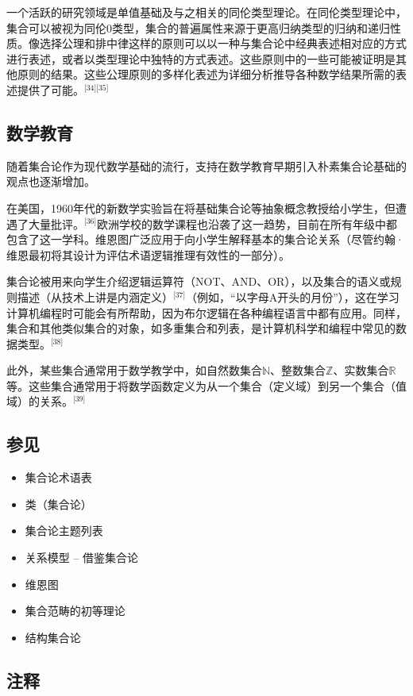一个活跃的研究领域是单值基础及与之相关的同伦类型理论。在同伦类型理论中，集合可以被视为同伦0类型，集合的普遍属性来源于更高归纳类型的归纳和递归性质。像选择公理和排中律这样的原则可以以一种与集合论中经典表述相对应的方式进行表述，或者以类型理论中独特的方式表述。这些原则中的一些可能被证明是其他原则的结果。这些公理原则的多样化表述为详细分析推导各种数学结果所需的表述提供了可能。\(^\text{[34][35]}\)
\subsection{数学教育}  
随着集合论作为现代数学基础的流行，支持在数学教育早期引入朴素集合论基础的观点也逐渐增加。

在美国，1960年代的新数学实验旨在将基础集合论等抽象概念教授给小学生，但遭遇了大量批评。\(^\text{[36]}\)欧洲学校的数学课程也沿袭了这一趋势，目前在所有年级中都包含了这一学科。维恩图广泛应用于向小学生解释基本的集合论关系（尽管约翰·维恩最初将其设计为评估术语逻辑推理有效性的一部分）。

集合论被用来向学生介绍逻辑运算符（NOT、AND、OR），以及集合的语义或规则描述（从技术上讲是内涵定义）\(^\text{[37]}\)（例如，“以字母A开头的月份”），这在学习计算机编程时可能会有所帮助，因为布尔逻辑在各种编程语言中都有应用。同样，集合和其他类似集合的对象，如多重集合和列表，是计算机科学和编程中常见的数据类型。\(^\text{[38]}\)

此外，某些集合通常用于数学教学中，如自然数集合$\mathbb{N}$、整数集合$\mathbb{Z}$、实数集合$\mathbb{R}$等。这些集合通常用于将数学函数定义为从一个集合（定义域）到另一个集合（值域）的关系。\(^\text{[39]}\)
\subsection{参见}
\begin{itemize}
\item 集合论术语表 
\item 类（集合论）  
\item 集合论主题列表  
\item 关系模型 – 借鉴集合论  
\item 维恩图  
\item 集合范畴的初等理论  
\item 结构集合论  
\end{itemize}
\subsection{注释}  

